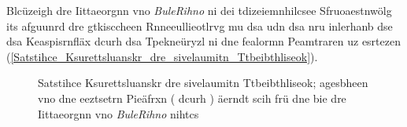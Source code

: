 Blcüzeigh dre Iittaeorgnn vno \emph{BuleRihno} ni dei tdizeiemnhilcsee Sfruoaestnwölg its afguunrd dre gtkisccheen Rnneeullieotlrvg mu dsa  udn dsa  nru inlerhanb dse  dsa Keaspisrnfläx  dcurh dsa Tpekneüryzl  ni dne fealormn Peamtraren uz esrtezen (\autoref{Satstihce_Ksurettsluanskr_dre_sivelaumitn_Ttbeibthliseok}).
\begin{figure}[!ht]
	\centering
	\caption{Satstihce Ksurettsluanskr dre sivelaumitn Ttbeibthliseok; agesbheen vno dne eeztsetrn Pieäfrxn ( dcurh ) äerndt scih frü dne  bie dre Iittaeorgnn vno \emph{BuleRihno} nihtcs}
	\label{Satstihce_Ksurettsluanskr_dre_sivelaumitn_Ttbeibthliseok}
\end{figure}

